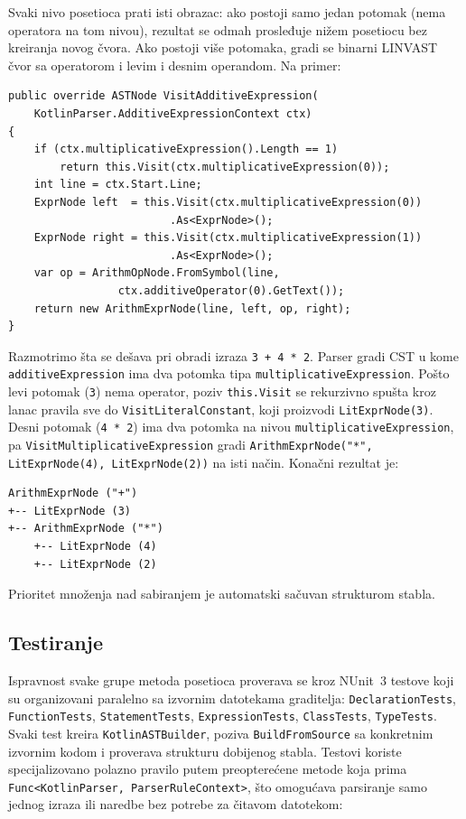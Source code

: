 \documentclass[a4paper]{article}
\begin{document}
Svaki nivo posetioca prati isti obrazac: ako postoji samo jedan potomak
(nema operatora na tom nivou), rezultat se odmah prosleđuje nižem posetiocu
bez kreiranja novog čvora. Ako postoji više potomaka, gradi se binarni
LINVAST čvor sa operatorom i levim i desnim operandom. Na primer:

\begin{lstlisting}[language=CSharp, caption={Posetilac za aditivni izraz}]
public override ASTNode VisitAdditiveExpression(
    KotlinParser.AdditiveExpressionContext ctx)
{
    if (ctx.multiplicativeExpression().Length == 1)
        return this.Visit(ctx.multiplicativeExpression(0));
    int line = ctx.Start.Line;
    ExprNode left  = this.Visit(ctx.multiplicativeExpression(0))
                         .As<ExprNode>();
    ExprNode right = this.Visit(ctx.multiplicativeExpression(1))
                         .As<ExprNode>();
    var op = ArithmOpNode.FromSymbol(line,
                 ctx.additiveOperator(0).GetText());
    return new ArithmExprNode(line, left, op, right);
}
\end{lstlisting}

\vspace{5px}
\begin{sloppypar}
\noindent
Razmotrimo šta se dešava pri obradi izraza \texttt{3 + 4 * 2}. Parser gradi
CST u kome \texttt{additiveExpression} ima dva potomka tipa
\texttt{multiplicativeExpression}. Pošto levi potomak (\texttt{3}) nema
operator, poziv \texttt{this.Visit} se rekurzivno spušta kroz lanac pravila
sve do \texttt{VisitLiteralConstant}, koji proizvodi \texttt{LitExprNode(3)}.
Desni potomak (\texttt{4 * 2}) ima dva potomka na nivou
\texttt{multiplicativeExpression}, pa \texttt{VisitMultiplicativeExpression}
gradi \texttt{ArithmExprNode("*", LitExprNode(4), LitExprNode(2))} na isti
način. Konačni rezultat je:
\end{sloppypar}

\begin{verbatim}
ArithmExprNode ("+")
+-- LitExprNode (3)
+-- ArithmExprNode ("*")
    +-- LitExprNode (4)
    +-- LitExprNode (2)
\end{verbatim}

\noindent
Prioritet množenja nad sabiranjem je automatski sačuvan strukturom stabla.

\newpage
\subsection{Testiranje}

Ispravnost svake grupe metoda posetioca proverava se kroz NUnit~3 testove
koji su organizovani paralelno sa izvornim datotekama graditelja:
\texttt{DeclarationTests}, \texttt{FunctionTests}, \texttt{StatementTests},
\texttt{ExpressionTests}, \texttt{ClassTests}, \texttt{TypeTests}. Svaki test kreira \texttt{KotlinASTBuilder},
poziva \texttt{BuildFromSource} sa konkretnim izvornim kodom i proverava
strukturu dobijenog stabla. Testovi koriste specijalizovano polazno pravilo
putem preopterećene metode koja prima \texttt{Func<KotlinParser,
ParserRuleContext>}, što omogućava parsiranje samo jednog izraza ili naredbe
bez potrebe za čitavom datotekom:
\end{document}
